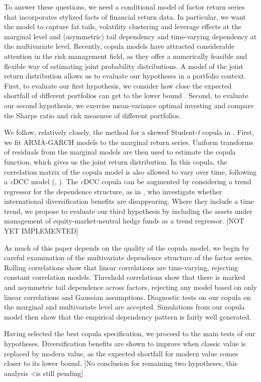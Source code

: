 To answer these questions, we need a conditional model of factor return series that incorporates stylized facts of financial return data. In particular, we want the model to capture fat tails, volatility clustering and leverage effects at the marginal level and (asymmetric) tail dependency and time-varying dependency at the multivariate level. Recently, copula models have attracted considerable attention in the risk management field, as they offer a numerically feasible and flexible way of estimating joint probability distributions. A model of the joint return distribution allows us to evaluate our hypotheses in a portfolio context. First, to evaluate our first hypothesis, we consider how close the expected shortfall of different portfolios can get to the lower bound \autocite{ChristoffersenErrunzaJacobLanglois2012}. Second, to evaluate our second hypothesis, we exercise mean-variance optimal investing and compare the Sharpe ratio and risk measures of different portfolios.

We follow, relatively closely, the method for a skewed Student-\textit{t} copula in \textcite{ChristoffersenLanglois2013}. First, we fit ARMA-GARCH models to the marginal return series. Uniform transforms of residuals from the marginal models are then used to estimate the copula function, which gives us the joint return distribution. In this copula, the correlation matrix of the copula model is also allowed to vary over time, following a \textit{c}DCC model (\textcite{Engle2002}, \textcite{Aielli2013}). The \textit{c}DCC copula can be augmented by considering a trend regressor for the dependence structure, as in \textcite{ChristoffersenErrunzaJacobLanglois2012}, who investigate whether international diversification benefits are disappearing. Where they include a time trend, we propose to evaluate our third hypothesis by including the assets under management of equity-market-neutral hedge funds as a trend regressor. [NOT YET IMPLEMENTED]

As much of this paper depends on the quality of the copula model, we begin by careful examination of the multivariate dependence structure of the factor series. Rolling correlations show that linear correlations are time-varying, rejecting constant correlation models. Threshold correlations show that there is marked and asymmetric tail dependence across factors, rejecting any model based on only linear correlations and Gaussian assumptions. Diagnostic tests on our copula on the marginal and multivariate level are accepted. Simulations from our copula model then show that the empirical dependency pattern is fairly well generated. 

Having selected the best copula specification, we proceed to the main tests of our hypotheses. Diversification benefits are shown to improve when classic value is replaced by modern value, as the expected shortfall for modern value comes closer to its lower bound. [No conclusion for remaining two hypotheses, this analysis <is still pending]
